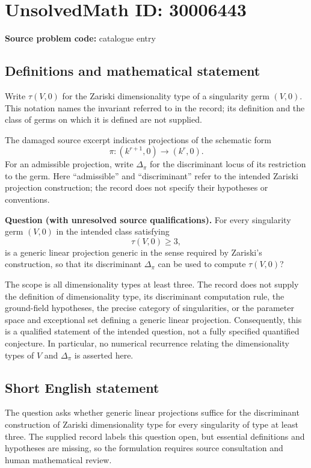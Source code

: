 \documentclass[11pt]{article}
\begin{document}
\section*{UnsolvedMath ID: 30006443}
\textbf{Source problem code:} catalogue entry
\subsection{Definitions and mathematical statement}
Write \(\tau(V,0)\) for the Zariski dimensionality type of a singularity germ \((V,0)\). This notation names the invariant referred to in the record; its definition and the class of germs on which it is defined are not supplied.

The damaged source excerpt indicates projections of the schematic form
\[
\pi\colon (k^{r+1},0)\longrightarrow (k^r,0).
\]
For an admissible projection, write \(\Delta_\pi\) for the discriminant locus of its restriction to the germ. Here ``admissible'' and ``discriminant'' refer to the intended Zariski projection construction; the record does not specify their hypotheses or conventions.

\textbf{Question (with unresolved source qualifications).} For every singularity germ \((V,0)\) in the intended class satisfying
\[
\tau(V,0)\geq 3,
\]
is a generic linear projection generic in the sense required by Zariski's construction, so that its discriminant \(\Delta_\pi\) can be used to compute \(\tau(V,0)\)?

The scope is all dimensionality types at least three. The record does not supply the definition of dimensionality type, its discriminant computation rule, the ground-field hypotheses, the precise category of singularities, or the parameter space and exceptional set defining a generic linear projection. Consequently, this is a qualified statement of the intended question, not a fully specified quantified conjecture. In particular, no numerical recurrence relating the dimensionality types of \(V\) and \(\Delta_\pi\) is asserted here.
\subsection{Short English statement}
The question asks whether generic linear projections suffice for the discriminant construction of Zariski dimensionality type for every singularity of type at least three. The supplied record labels this question open, but essential definitions and hypotheses are missing, so the formulation requires source consultation and human mathematical review.
\end{document}
